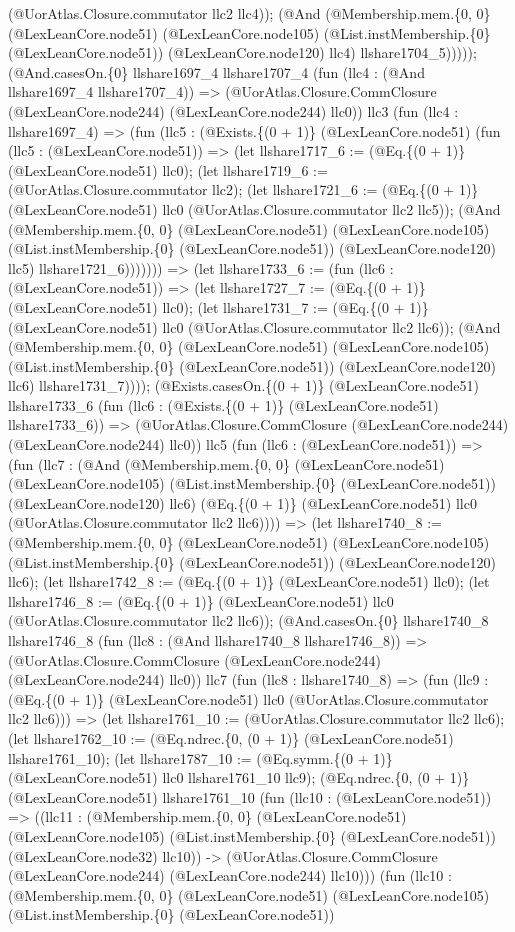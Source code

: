 \documentclass[11pt]{article}
\begin{document}
(@UorAtlas.Closure.commutator llc2 llc4)); (@And (@Membership.mem.\{0, 0\} (@LexLeanCore.node51) (@LexLeanCore.node105) (@List.instMembership.\{0\} (@LexLeanCore.node51)) (@LexLeanCore.node120) llc4) llshare1704\_5))))); (@And.casesOn.\{0\} llshare1697\_4 llshare1707\_4 (fun (llc4 : (@And llshare1697\_4 llshare1707\_4)) => (@UorAtlas.Closure.CommClosure (@LexLeanCore.node244) (@LexLeanCore.node244) llc0)) llc3 (fun (llc4 : llshare1697\_4) => (fun (llc5 : (@Exists.\{(0 + 1)\} (@LexLeanCore.node51) (fun (llc5 : (@LexLeanCore.node51)) => (let llshare1717\_6 := (@Eq.\{(0 + 1)\} (@LexLeanCore.node51) llc0); (let llshare1719\_6 := (@UorAtlas.Closure.commutator llc2); (let llshare1721\_6 := (@Eq.\{(0 + 1)\} (@LexLeanCore.node51) llc0 (@UorAtlas.Closure.commutator llc2 llc5)); (@And (@Membership.mem.\{0, 0\} (@LexLeanCore.node51) (@LexLeanCore.node105) (@List.instMembership.\{0\} (@LexLeanCore.node51)) (@LexLeanCore.node120) llc5) llshare1721\_6))))))) => (let llshare1733\_6 := (fun (llc6 : (@LexLeanCore.node51)) => (let llshare1727\_7 := (@Eq.\{(0 + 1)\} (@LexLeanCore.node51) llc0); (let llshare1731\_7 := (@Eq.\{(0 + 1)\} (@LexLeanCore.node51) llc0 (@UorAtlas.Closure.commutator llc2 llc6)); (@And (@Membership.mem.\{0, 0\} (@LexLeanCore.node51) (@LexLeanCore.node105) (@List.instMembership.\{0\} (@LexLeanCore.node51)) (@LexLeanCore.node120) llc6) llshare1731\_7)))); (@Exists.casesOn.\{(0 + 1)\} (@LexLeanCore.node51) llshare1733\_6 (fun (llc6 : (@Exists.\{(0 + 1)\} (@LexLeanCore.node51) llshare1733\_6)) => (@UorAtlas.Closure.CommClosure (@LexLeanCore.node244) (@LexLeanCore.node244) llc0)) llc5 (fun (llc6 : (@LexLeanCore.node51)) => (fun (llc7 : (@And (@Membership.mem.\{0, 0\} (@LexLeanCore.node51) (@LexLeanCore.node105) (@List.instMembership.\{0\} (@LexLeanCore.node51)) (@LexLeanCore.node120) llc6) (@Eq.\{(0 + 1)\} (@LexLeanCore.node51) llc0 (@UorAtlas.Closure.commutator llc2 llc6)))) => (let llshare1740\_8 := (@Membership.mem.\{0, 0\} (@LexLeanCore.node51) (@LexLeanCore.node105) (@List.instMembership.\{0\} (@LexLeanCore.node51)) (@LexLeanCore.node120) llc6); (let llshare1742\_8 := (@Eq.\{(0 + 1)\} (@LexLeanCore.node51) llc0); (let llshare1746\_8 := (@Eq.\{(0 + 1)\} (@LexLeanCore.node51) llc0 (@UorAtlas.Closure.commutator llc2 llc6)); (@And.casesOn.\{0\} llshare1740\_8 llshare1746\_8 (fun (llc8 : (@And llshare1740\_8 llshare1746\_8)) => (@UorAtlas.Closure.CommClosure (@LexLeanCore.node244) (@LexLeanCore.node244) llc0)) llc7 (fun (llc8 : llshare1740\_8) => (fun (llc9 : (@Eq.\{(0 + 1)\} (@LexLeanCore.node51) llc0 (@UorAtlas.Closure.commutator llc2 llc6))) => (let llshare1761\_10 := (@UorAtlas.Closure.commutator llc2 llc6); (let llshare1762\_10 := (@Eq.ndrec.\{0, (0 + 1)\} (@LexLeanCore.node51) llshare1761\_10); (let llshare1787\_10 := (@Eq.symm.\{(0 + 1)\} (@LexLeanCore.node51) llc0 llshare1761\_10 llc9); (@Eq.ndrec.\{0, (0 + 1)\} (@LexLeanCore.node51) llshare1761\_10 (fun (llc10 : (@LexLeanCore.node51)) => ((llc11 : (@Membership.mem.\{0, 0\} (@LexLeanCore.node51) (@LexLeanCore.node105) (@List.instMembership.\{0\} (@LexLeanCore.node51)) (@LexLeanCore.node32) llc10)) -> (@UorAtlas.Closure.CommClosure (@LexLeanCore.node244) (@LexLeanCore.node244) llc10))) (fun (llc10 : (@Membership.mem.\{0, 0\} (@LexLeanCore.node51) (@LexLeanCore.node105) (@List.instMembership.\{0\} (@LexLeanCore.node51)) 
\end{document}

